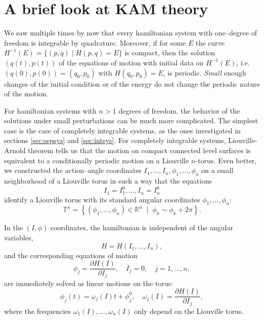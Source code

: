 \documentclass[english,fontsize=11pt,paper=a5,oneside]{scrbook}
\newcommand{\R}{\mathbb{R}}
\newcommand{\T}{\mathbb{T}}
\theoremstyle{definition}
\begin{document}

\section{A brief look at KAM theory}

We saw multiple times by now that every hamiltonian system with one--degree of freedom is integrable by quadrature.
Moreover, if for some $E$ the curve $H^{-1}(E) = \{(p,q)\mid H(p,q) = E\}$ is compact, then the solution $(q(t),p(t))$ of the equations of motion with initial data on $H^{-1}(E)$, i.e. $(q(0), p(0)) = (q_0, p_0)$ with $H(q_0,p_0)=E$, is periodic. \emph{Small} enough changes of the initial condition or of the energy do not change the periodic nature of the motion.

For hamiltonian systems with $n>1$ degrees of freedom, the behavior of the solutions under small perturbations can be much more complicated.
The simplest case is the case of completely integrable systems, as the ones investigated in sections \ref{sec:sepsys} and \ref{sec:intsys}.
For completely integrable systems, Liouville-Arnold theorem tells us that the motion on compact connected level surfaces is equivalent to a conditionally periodic motion on a Liouville $n$-torus.
Even better, we constructed the action--angle coordinates $I_1, \ldots, I_n, \phi_1, \ldots, \phi_n$ on a small neighborhood of a Liouville torus in such a way that the equations
\begin{equation}
    I_1 = I_1^0, \ldots, I_n = I_n^0
\end{equation}
identify a Liouville torus with its standard angular coordinates $\phi_1, \ldots, \phi_n$:
\begin{equation}
    \T^n = \left\{(\phi_1, \ldots, \phi_n)\in\R^n \;\mid\; \phi_k\sim \phi_k + 2\pi\right\}.
\end{equation}

In the $(I,\phi)$ coordinates, the hamiltonian is independent of the angular variables,
\begin{equation}
    H = H(I_1, \ldots, I_n),
\end{equation}
and the corresponding equations of motion
\begin{equation}
    \dot \phi_j = \frac{\partial H(I)}{\partial I_j}, \quad
    \dot I_j = 0, \quad
    j=1,\ldots,n,
\end{equation}
are immediately solved as linear motions on the torus:
\begin{equation}
    \phi_j(t) = \omega_j(I) t + \phi_j^0, \quad \omega_j(I) = \frac{\partial H(I)}{\partial I_j},
\end{equation}
where the frequencies $\omega_1(I), \ldots, \omega_n(I)$ only depend on the Liouville torus.
\end{document}
